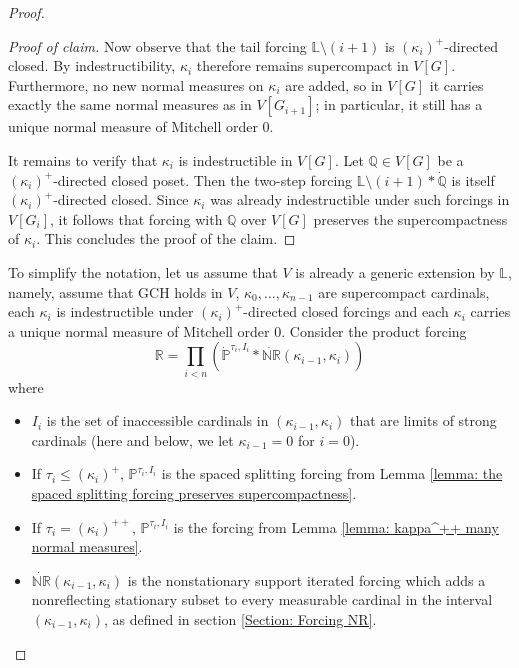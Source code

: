 \documentclass[11pt]{amsart}
\theoremstyle{definition}
\theoremstyle{remark}
\newcommand\<{{<}}
\newcommand{\po}{\mathbb{P}}
\newcommand{\qo}{\mathbb{Q}}
\begin{document}
\begin{proof}
\begin{proof}[Proof of claim]
Now observe that the tail forcing $\mathbb{L}\setminus (i+1)$ is $(\kappa_i)^+$-directed closed. By indestructibility, $\kappa_i$ therefore remains supercompact in $V[G]$. Furthermore, no new normal measures on $\kappa_i$ are added, so in $V[G]$ it carries exactly the same normal measures as in $V[G_{i+1}]$; in particular, it still has a unique normal measure of Mitchell order $0$.

It remains to verify that $\kappa_i$ is indestructible in $V[G]$. Let $\qo \in V[G]$ be a $(\kappa_i)^+$-directed closed poset. Then the two-step forcing $\mathbb{L}\setminus (i+1) \ast \dot{\qo}$ is itself $(\kappa_i)^+$-directed closed. Since $\kappa_i$ was already indestructible under such forcings in $V[G_i]$, it follows that forcing with $\qo$ over $V[G]$ preserves the supercompactness of $\kappa_i$. This concludes the proof of the claim.
\end{proof}

To simplify the notation, let us assume that $V$ is already a generic extension by $\mathbb{L}$, namely, assume that GCH holds in $V$, $\kappa_0,\ldots, \kappa_{n-1}$ are supercompact cardinals, each $\kappa_i$ is indestructible under $(\kappa_i)^+$-directed closed forcings and each $\kappa_i$ carries a unique normal measure of Mitchell order $0$. Consider the product forcing
$$\mathbb{R} = \textstyle \prod_{i<n}(\dot{\mathbb{P}}^{\tau_i,I_i}\ast \dot{\mathbb{NR}}{(\kappa_{i-1},\kappa_i)})$$ where
\begin{itemize}
    \item $I_i$ is the set of inaccessible cardinals in $(\kappa_{i-1},\kappa_i)$ that are limits of strong cardinals (here and below, we let $\kappa_{i-1} = 0$ for $i=0$).
    \item If $\tau_i \leq (\kappa_i)^+$, $\mathbb{P}^{\tau_i,I_i}$ is the spaced splitting forcing from Lemma \ref{lemma: the spaced splitting forcing preserves supercompactness}.
    \item If $\tau_i = (\kappa_i)^{++}$, $\po^{\tau_i, I_i}$ is the forcing from Lemma \ref{lemma: kappa^++ many normal measures}.
    \item $\dot{\mathbb{NR}}{(\kappa_{i-1},\kappa_i)}$ is the nonstationary support iterated forcing which adds a  nonreflecting stationary subset to every measurable cardinal in the interval $(\kappa_{i-1}, \kappa_i)$, as defined in section \ref{Section: Forcing NR}.
\end{itemize}


\end{proof}
\end{document}
